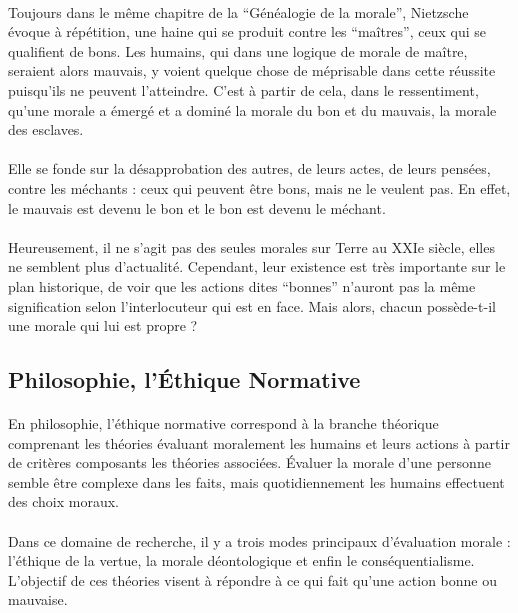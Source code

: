 \documentclass[10pt, french, a4paper]{report}
\begin{document}
\paragraph{}
Toujours dans le même chapitre de la ``Généalogie de la morale'', Nietzsche évoque à répétition, une haine qui se produit contre les ``maîtres'', ceux qui se qualifient de bons. Les humains, qui dans une logique de morale de maître, seraient alors mauvais, y voient quelque chose de méprisable dans cette réussite puisqu’ils ne peuvent l’atteindre. C’est à partir de cela, dans le ressentiment, qu’une morale a émergé et a dominé la morale du bon et du mauvais, la morale des esclaves.

\paragraph{}
Elle se fonde sur la désapprobation des autres, de leurs actes, de leurs pensées, contre les méchants : ceux qui peuvent être bons, mais ne le veulent pas. En effet, le mauvais est devenu le bon et le bon est devenu le méchant.

\paragraph{}
Heureusement, il ne s’agit pas des seules morales sur Terre au XXIe siècle, elles ne semblent plus d’actualité. Cependant, leur existence est très importante sur le plan historique, de voir que les actions dites ``bonnes'' n’auront pas la même signification selon l’interlocuteur qui est en face. Mais alors, chacun possède-t-il une morale qui lui est propre ?

\subsection{Philosophie, l'\uppercase{é}thique Normative}
\label{subsec:ethique_jugement_chacun}

\paragraph{}
En philosophie, l'éthique normative correspond à la branche théorique comprenant les théories évaluant moralement les humains et leurs actions à partir de critères composants les théories associées. \uppercase{é}valuer la morale d'une personne semble être complexe dans les faits, mais quotidiennement les humains effectuent des choix moraux.

\paragraph{}
Dans ce domaine de recherche, il y a trois modes principaux d'évaluation morale : l'éthique de la vertue, la morale déontologique et enfin le conséquentialisme. L'objectif de ces théories visent à répondre à ce qui fait qu'une action bonne ou mauvaise.
\end{document}
